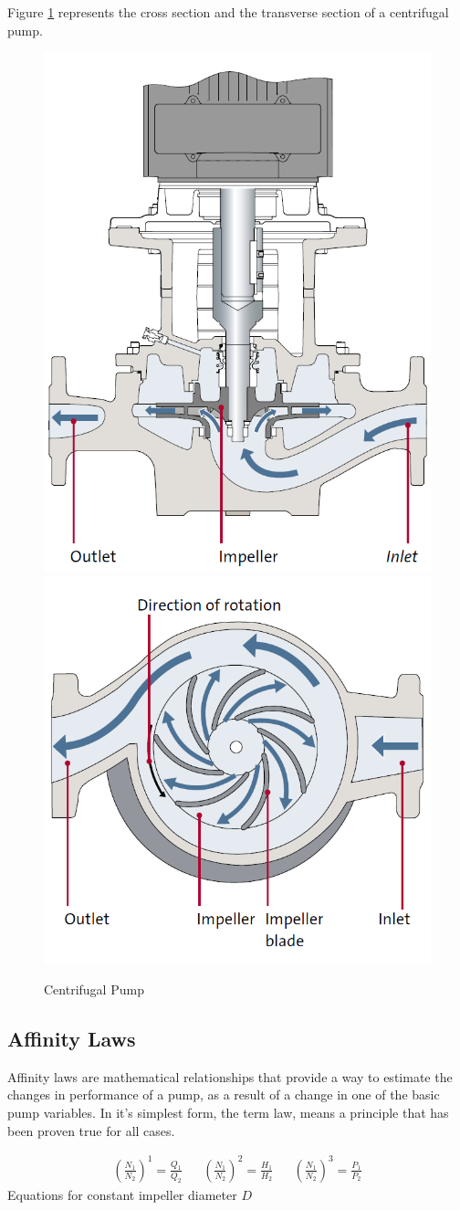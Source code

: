 \newpage
Figure \ref{fig:pump_sections} represents the cross section and the transverse section of a centrifugal pump.
\begin{figure}[h]
    \centering
    \includegraphics[width=0.4\linewidth]{figures/pump_cross_section.PNG}
    \qquad
    \hfill
    \includegraphics[width=0.4\linewidth]{figures/pump_above_view.PNG}
    \caption{Centrifugal Pump}
    \label{fig:pump_sections}
\end{figure}

\subsection{Affinity Laws}
Affinity laws are mathematical relationships that provide a way to estimate the changes in performance of a pump, as a result
of a change in one of the basic pump variables.
In it's simplest form, the term law, means a principle that has been proven true for all cases.

\begin{align}
	\left(\frac{N_1}{N_2}\right)^1 = \frac{Q_1}{Q_2} &&
	\left(\frac{N_1}{N_2}\right)^2 = \frac{H_1}{H_2} &&
	\left(\frac{N_1}{N_2}\right)^3 = \frac{P_1}{P_2}	
\end{align} 
Equations for constant impeller diameter $D$ \cite{Volk2014}


